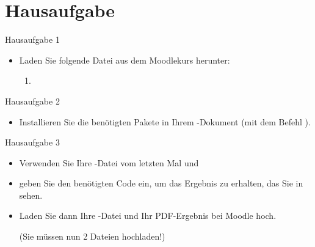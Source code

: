 \section{Hausaufgabe}
%
\begin{frame}{Hausaufgabe 1}

\begin{itemize}
	
	\item Laden Sie folgende Datei aus dem Moodlekurs herunter:
	
	\begin{enumerate}
		\item {}
	\end{enumerate}
		
\end{itemize}

\end{frame}


\begin{frame}{Hausaufgabe 2}

\begin{itemize}
	
	\item Installieren Sie die benötigten Pakete in Ihrem -Dokument (mit dem Befehl ).
	
\end{itemize}

\end{frame}


\begin{frame}{Hausaufgabe 3}

\begin{itemize}
	
	\item Verwenden Sie Ihre -Datei vom letzten Mal und
	
	\item geben Sie den benötigten Code ein, um das Ergebnis zu erhalten, das Sie in  sehen.
	
	\item Laden Sie dann Ihre -Datei und Ihr PDF-Ergebnis bei Moodle hoch. 
	
	(Sie müssen nun 2 Dateien hochladen!)
	
\end{itemize}

\end{frame}


